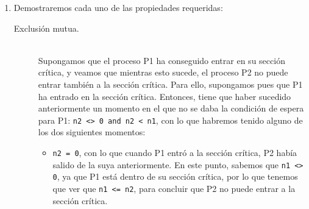 \begin{ejercicio}
    \begin{enumerate}[label=(\alph*)]
        \item Demostraremos cada uno de las propiedades requeridas:
            \begin{description}
                \item [Exclusión mutua.]~\\
                    Supongamos que el proceso P1 ha conseguido entrar en su sección crítica, y veamos que mientras esto sucede, el proceso P2 no puede entrar también a la sección crítica. Para ello, supongamos pues que P1 ha entrado en la sección crítica. Entonces, tiene que haber sucedido anteriormente un momento en el que no se daba la condición de espera para P1: \verb|n2 <> 0 and n2 < n1|, con lo que habremos tenido alguno de los dos siguientes momentos:
                    \begin{itemize}
                        \item \verb|n2 = 0|, con lo que cuando P1 entró a la sección crítica, P2 había salido de la suya anteriormente. En este punto, sabemos que \verb|n1 <> 0|, ya que P1 está dentro de su sección crítica, por lo que tenemos que ver que \verb|n1 <= n2|, para concluir que P2 no puede entrar a la sección crítica.


\end{itemize}
\end{description}
\end{enumerate}
\end{ejercicio}
